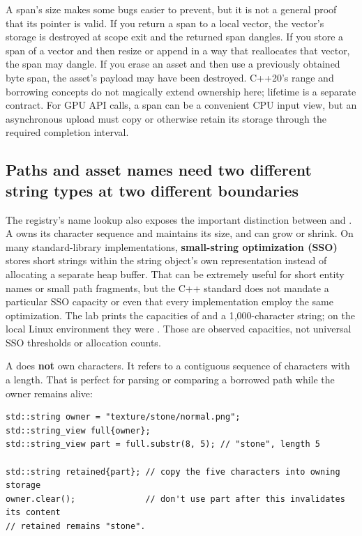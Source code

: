 A span's size makes some bugs easier to prevent, but it is not a general proof that its pointer is valid. If you return a span to a local vector, the vector's storage is destroyed at scope exit and the returned span dangles. If you store a span of a vector and then resize or append in a way that reallocates that vector, the span may dangle. If you erase an asset and then use a previously obtained byte span, the asset's payload may have been destroyed. C++20's range and borrowing concepts do not magically extend ownership here; lifetime is a separate contract. For GPU API calls, a span can be a convenient CPU input view, but an asynchronous upload must copy or otherwise retain its storage through the required completion interval.

\subsection{Paths and asset names need two different string types at two different boundaries}\label{05-engine-i-ch005-paths-and-asset-names-need-two-different-string-types-at-two-different-boundaries}

\hypertarget{05-engine-i-ch005-paths-and-asset-names-need-two-different-string-types-at-two-different-boundaries}{}

The registry's name lookup also exposes the important distinction between  and . A  owns its character sequence and maintains its size, and can grow or shrink. On many standard-library implementations, \textbf{small-string optimization (SSO)} stores short strings within the string object's own representation instead of allocating a separate heap buffer. That can be extremely useful for short entity names or small path fragments, but the C++ standard does not mandate a particular SSO capacity or even that every implementation employ the same optimization. The lab prints the capacities of  and a 1,000-character string; on the local Linux environment they were . Those are observed capacities, not universal SSO thresholds or allocation counts.

A  does \textbf{not} own characters. It refers to a contiguous sequence of characters with a length. That is perfect for parsing or comparing a borrowed path while the owner remains alive:

\begin{verbatim}
std::string owner = "texture/stone/normal.png";
std::string_view full{owner};
std::string_view part = full.substr(8, 5); // "stone", length 5

std::string retained{part}; // copy the five characters into owning storage
owner.clear();              // don't use part after this invalidates its content
// retained remains "stone".
\end{verbatim}


